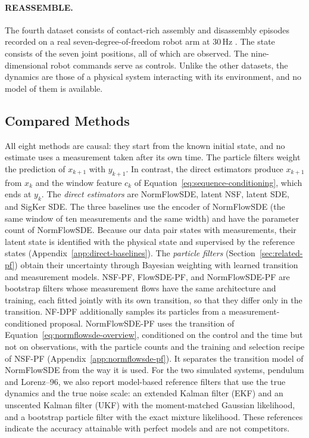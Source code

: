 \paragraph{REASSEMBLE.}
The fourth dataset consists of contact-rich assembly and disassembly episodes recorded on a real seven-degree-of-freedom robot arm at 30\,Hz \citep{sliwowski2025reassemble}. The state consists of the seven joint positions, all of which are observed. The nine-dimensional robot commands serve as controls. Unlike the other datasets, the dynamics are those of a physical system interacting with its environment, and no model of them is available.

\subsection{Compared Methods}\label{sec:experiments-methods}
All eight methods are causal: they start from the known initial state, and no estimate uses a measurement taken after its own time. The particle filters weight the prediction of $x_{k+1}$ with $y_{k+1}$. In contrast, the direct estimators produce $x_{k+1}$ from $x_k$ and the window feature $c_k$ of Equation~\eqref{eq:sequence-conditioning}, which ends at $y_k$. The \emph{direct estimators} are NormFlowSDE, latent NSF, latent SDE, and SigKer SDE. The three baselines use the encoder of NormFlowSDE (the same window of ten measurements and the same width) and have the parameter count of NormFlowSDE. Because our data pair states with measurements, their latent state is identified with the physical state and supervised by the reference states (Appendix~\ref{app:direct-baselines}). The \emph{particle filters} (Section~\ref{sec:related-pf}) obtain their uncertainty through Bayesian weighting with learned transition and measurement models. NSF-PF, FlowSDE-PF, and NormFlowSDE-PF are bootstrap filters whose measurement flows have the same architecture and training, each fitted jointly with its own transition, so that they differ only in the transition. NF-DPF additionally samples its particles from a measurement-conditioned proposal. NormFlowSDE-PF uses the transition of Equation~\eqref{eq:normflowsde-overview}, conditioned on the control and the time but not on observations, with the particle counts and the training and selection recipe of NSF-PF (Appendix~\ref{app:normflowsde-pf}). It separates the transition model of NormFlowSDE from the way it is used. For the two simulated systems, pendulum and Lorenz--96, we also report model-based reference filters that use the true dynamics and the true noise scale: an extended Kalman filter (EKF) and an unscented Kalman filter (UKF) with the moment-matched Gaussian likelihood, and a bootstrap particle filter with the exact mixture likelihood. These references indicate the accuracy attainable with perfect models and are not competitors.

